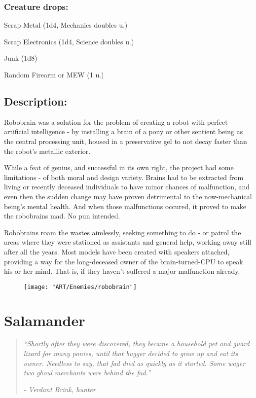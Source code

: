 \documentclass[11pt,a4paper,twocolumn]{book}
\begin{document}
	\subsubsection*{Creature drops:}
	\begin{compactitem}
		\item Scrap Metal (1d4, Mechanics doubles u.)
		\item Scrap Electronics (1d4, Science doubles u.)
		\item Junk (1d8)
		\item Random Firearm or MEW (1 u.)
	\end{compactitem}
	
	
	\subsection*{Description:}
	Robobrain was a solution for the problem of creating a robot with perfect artificial intelligence - by installing a brain of a pony or other sentient being as the central processing unit, housed in a preservative gel to not decay faster than the robot's metallic exterior. 
	
	While a feat of genius, and successful in its own right, the project had some limitations - of both moral and design variety. Brains had to be extracted from living or recently deceased individuals to have minor chances of malfunction, and even then the sudden change may have proven detrimental to the now-mechanical being's mental health. And when those malfunctions occured, it proved to make the robobrains mad. No pun intended. 
	
	Robobrains roam the wastes aimlessly, seeking something to do - or patrol the areas where they were stationed as assistants and general help, working away still after all the years. Most models have been created with speakers attached, providing a way for the long-deceased owner of the brain-turned-CPU to speak his or her mind. That is, if they haven't suffered a major malfunction already. 
	
	\begin{figure}[h]
		\centering
		\texttt{[image: "ART/Enemies/robobrain"]}
	\end{figure}
	
	\clearpage
	
	\section*{Salamander}
	\begin{quote}
		\emph{``Shortly after they were discovered, they became a household pet and guard lizard for many ponies, until that bugger decided to grow up and eat its owner.  Needless to say, that fad died as quickly as it started. Some wager two ghoul merchants were behind the fad.''}
		
		\emph{-	Verdant Brink, hunter}
	\end{quote}
	
\end{document}
